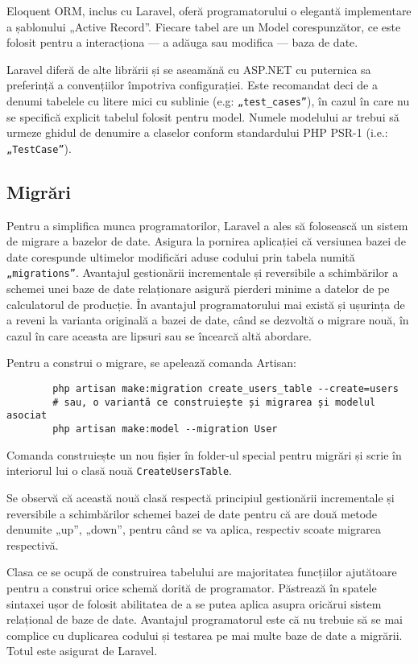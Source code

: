 		Eloquent ORM, inclus cu Laravel, oferă programatorului o elegantă implementare a șablonului „Active Record”.
		Fiecare tabel are un Model corespunzător, ce este folosit pentru a interacționa --- a adăuga sau modifica --- baza de date.

		Laravel diferă de alte librării și se aseamănă cu ASP.NET cu puternica sa preferință a convențiilor împotriva configurației.
		Este recomandat deci de a denumi tabelele cu litere mici cu sublinie (e.g: \verb|„test_cases”|), în cazul în care nu se specifică explicit tabelul folosit pentru model.
		Numele modelului ar trebui să urmeze ghidul de denumire a claselor conform standardului PHP PSR-1 \cite{psr_1} (i.e.: \verb|„TestCase”|).

	\subsection{Migrări}

		Pentru a simplifica munca programatorilor, Laravel a ales să folosească un sistem de migrare a bazelor de date.
		Asigura la pornirea aplicației că versiunea bazei de date corespunde ultimelor modificări aduse codului prin tabela numită \verb|„migrations”|.
		Avantajul gestionării incrementale și reversibile a schimbărilor a schemei unei baze de date relaționare asigură pierderi minime a datelor de pe calculatorul de producție.
		În avantajul programatorului mai există și ușurința de a reveni la varianta originală a bazei de date, când se dezvoltă o migrare nouă, în cazul în care aceasta are lipsuri sau se încearcă altă abordare.

		Pentru a construi o migrare, se apelează comanda Artisan:
		\begin{verbatim}
		php artisan make:migration create_users_table --create=users
		# sau, o variantă ce construiește și migrarea și modelul asociat
		php artisan make:model --migration User
		\end{verbatim}
		Comanda construiește un nou fișier în folder-ul special pentru migrări și scrie în interiorul lui o clasă nouă \verb|CreateUsersTable|.

		Se observă că această nouă clasă respectă principiul gestionării incrementale și reversibile a schimbărilor schemei bazei de date pentru că are două metode denumite „up”, „down”, pentru când se va aplica, respectiv scoate migrarea respectivă.

		Clasa ce se ocupă de construirea tabelului are majoritatea funcțiilor ajutătoare pentru a construi orice schemă dorită de programator.
		Păstrează în spatele sintaxei ușor de folosit abilitatea de a se putea aplica asupra oricărui sistem relațional de baze de date.
		Avantajul programatorul este că nu trebuie să se mai complice cu duplicarea codului și testarea pe mai multe baze de date a migrării.
		Totul este asigurat de Laravel.
